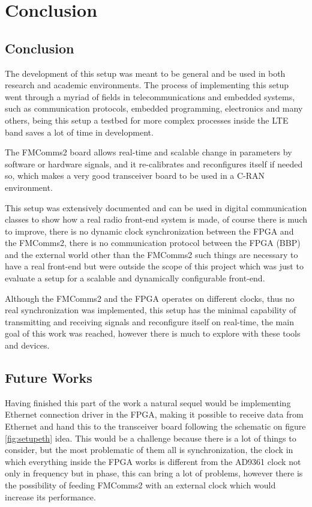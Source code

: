 \chapter{Conclusion}
\label{chap:conclusion}

\section{Conclusion}
\label{sec:conclusion}

The development of this setup was meant to be general and be used in both
research and academic environments. The process of implementing this setup went
through a myriad of fields in telecommunications and embedded systems, such as
communication protocols, embedded programming, electronics and many others,
being this setup a testbed for more complex processes inside the LTE band saves
a lot of time in development.

The FMComms2 board allows real-time and scalable change in parameters by
software or hardware signals, and it re-calibrates and reconfigures itself if
needed so, which makes a very good transceiver board to be used in a C-RAN
environment.

This setup was extensively documented and can be used in digital communication
classes to show how a real radio front-end system is made, of course there is
much to improve, there is no dynamic clock synchronization between the FPGA and
the FMComms2, there is no communication protocol between the FPGA (BBP) and the
external world other than the FMComms2 such things are necessary to have a real
front-end but were outside the scope of this project which was just to evaluate a
setup for a scalable and dynamically configurable front-end.

Although the FMComms2 and the FPGA operates on different clocks, thus no real
synchronization was implemented, this setup has the minimal capability of
transmitting and receiving signals and reconfigure itself on real-time, the main
goal of this work was reached, however there is much to explore with these tools
and devices.

\section{Future Works}
\label{sec:futurew}

Having finished this part of the work a natural sequel would be implementing
Ethernet connection driver in the FPGA, making it possible to receive data from
Ethernet and hand this to the transceiver board following the schematic on
figure \ref{fig:setupeth} idea. This would be a challenge because there is a lot
of things to consider, but the most problematic of them all is synchronization,
the clock in which everything inside the FPGA works is different from the AD9361
clock not only in frequency but in phase, this can bring a lot of problems,
however there is the possibility of feeding FMComms2 with an external clock
which would increase its performance.


